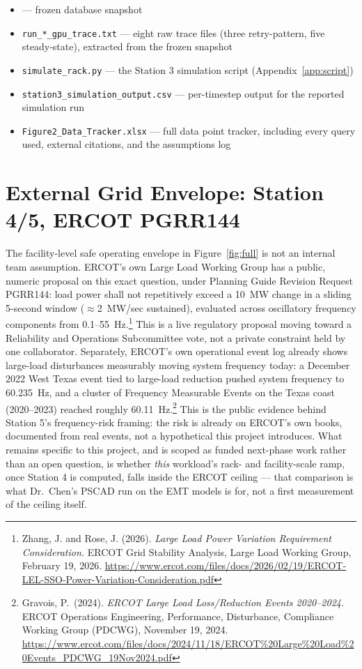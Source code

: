 \documentclass[10pt]{article}
\begin{document}
\begin{itemize}
\item {} --- frozen
  database snapshot
\item \texttt{run\_*\_gpu\_trace.txt} --- eight raw trace files (three
  retry-pattern, five steady-state), extracted from the frozen snapshot
\item \texttt{simulate\_rack.py} --- the Station 3 simulation script
  (Appendix~\ref{app:script})
\item \texttt{station3\_simulation\_output.csv} --- per-timestep output for
  the reported simulation run
\item \texttt{Figure2\_Data\_Tracker.xlsx} --- full data point tracker,
  including every query used, external citations, and the assumptions log
\end{itemize}

\section{External Grid Envelope: Station 4/5, ERCOT PGRR144}
\label{sec:ercot-envelope}

The facility-level safe operating envelope in Figure~\ref{fig:full} is not an
internal team assumption. ERCOT's own Large Load Working Group has a public,
numeric proposal on this exact question, under Planning Guide Revision
Request PGRR144: load power shall not repetitively exceed a 10~MW change in
a sliding 5-second window ($\approx$2~MW/sec sustained), evaluated across
oscillatory frequency components from 0.1--55~Hz.\footnote{Zhang, J. and
Rose, J. (2026). \emph{Large Load Power Variation Requirement
Consideration.} ERCOT Grid Stability Analysis, Large Load Working Group,
February 19, 2026.
\url{https://www.ercot.com/files/docs/2026/02/19/ERCOT-LEL-SSO-Power-Variation-Consideration.pdf}}
This is a live regulatory proposal moving toward a Reliability and
Operations Subcommittee vote, not a private constraint held by one
collaborator. Separately, ERCOT's own operational event log already shows
large-load disturbances measurably moving system frequency today: a
December 2022 West Texas event tied to large-load reduction pushed system
frequency to 60.235~Hz, and a cluster of Frequency Measurable Events on the
Texas coast (2020--2023) reached roughly 60.11~Hz.\footnote{Gravois, P.\
(2024). \emph{ERCOT Large Load Loss/Reduction Events 2020--2024.} ERCOT
Operations Engineering, Performance, Disturbance, Compliance Working Group
(PDCWG), November 19, 2024.
\url{https://www.ercot.com/files/docs/2024/11/18/ERCOT\%20Large\%20Load\%20Events_PDCWG_19Nov2024.pdf}}
This is the public evidence behind Station 5's frequency-risk framing: the
risk is already on ERCOT's own books, documented from real events, not a
hypothetical this project introduces. What remains specific to this
project, and is scoped as funded next-phase work rather than an open
question, is whether \emph{this} workload's rack- and
facility-scale ramp, once Station 4 is computed, falls inside the ERCOT
ceiling --- that comparison is what Dr.\ Chen's PSCAD run on the EMT models
is for, not a first measurement of the ceiling itself.
\end{document}

